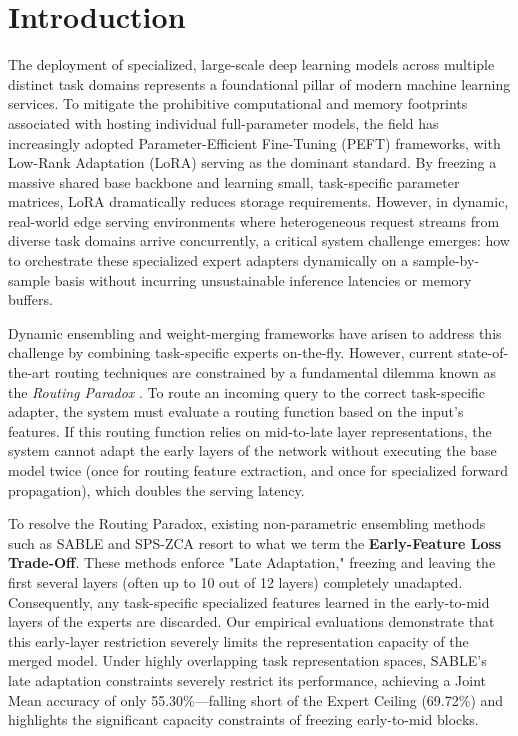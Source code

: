 \section{Introduction}
\label{sec:intro}

The deployment of specialized, large-scale deep learning models across multiple distinct task domains represents a foundational pillar of modern machine learning services. To mitigate the prohibitive computational and memory footprints associated with hosting individual full-parameter models, the field has increasingly adopted Parameter-Efficient Fine-Tuning (PEFT) frameworks, with Low-Rank Adaptation (LoRA) \cite{hu2021lora} serving as the dominant standard. By freezing a massive shared base backbone and learning small, task-specific parameter matrices, LoRA dramatically reduces storage requirements. However, in dynamic, real-world edge serving environments where heterogeneous request streams from diverse task domains arrive concurrently, a critical system challenge emerges: how to orchestrate these specialized expert adapters dynamically on a sample-by-sample basis without incurring unsustainable inference latencies or memory buffers.

Dynamic ensembling and weight-merging frameworks have arisen to address this challenge by combining task-specific experts on-the-fly. However, current state-of-the-art routing techniques are constrained by a fundamental dilemma known as the \emph{Routing Paradox} \cite{sable2025}. To route an incoming query to the correct task-specific adapter, the system must evaluate a routing function based on the input's features. If this routing function relies on mid-to-late layer representations, the system cannot adapt the early layers of the network without executing the base model twice (once for routing feature extraction, and once for specialized forward propagation), which doubles the serving latency. 

To resolve the Routing Paradox, existing non-parametric ensembling methods such as SABLE \cite{sable2025} and SPS-ZCA \cite{spszca2025} resort to what we term the \textbf{Early-Feature Loss Trade-Off}. These methods enforce "Late Adaptation," freezing and leaving the first several layers (often up to 10 out of 12 layers) completely unadapted. Consequently, any task-specific specialized features learned in the early-to-mid layers of the experts are discarded. Our empirical evaluations demonstrate that this early-layer restriction severely limits the representation capacity of the merged model. Under highly overlapping task representation spaces, SABLE's late adaptation constraints severely restrict its performance, achieving a Joint Mean accuracy of only 55.30\%---falling short of the Expert Ceiling (69.72\%) and highlights the significant capacity constraints of freezing early-to-mid blocks.

